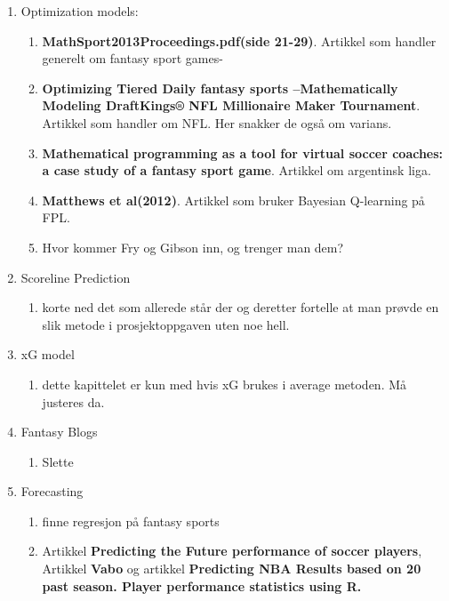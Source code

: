 \begin{enumerate}
    \item Optimization models: 
    \begin{enumerate}
        \item \textbf{MathSport2013Proceedings.pdf(side 21-29)}. Artikkel som handler generelt om fantasy sport games- 
        \item \textbf{Optimizing Tiered Daily fantasy sports –Mathematically Modeling DraftKings® NFL Millionaire Maker Tournament}. Artikkel som handler om NFL. Her snakker de også om varians.
        \item \textbf{Mathematical programming as a tool for virtual soccer coaches: a case study of a fantasy sport game}. Artikkel om argentinsk liga. 
        \item \textbf{Matthews et al(2012)}. Artikkel som bruker Bayesian Q-learning på FPL.
        \item Hvor kommer Fry og Gibson inn, og trenger man dem? 
    \end{enumerate}

    \item Scoreline Prediction
    \begin{enumerate}
        \item korte ned det som allerede står der og deretter fortelle at man prøvde en slik metode i prosjektoppgaven uten noe hell. 
    \end{enumerate}
    
    \item xG model 
    \begin{enumerate}
        \item dette kapittelet er kun med hvis xG brukes i average metoden. Må justeres da.
    \end{enumerate}
    
    \item Fantasy Blogs
    \begin{enumerate}
        \item Slette
    \end{enumerate}
    
    \item Forecasting 
        \begin{enumerate}
            \item finne regresjon på fantasy sports 
            \item Artikkel \textbf{Predicting the Future performance of
            soccer players}, Artikkel \textbf{Vabo} og artikkel \textbf{Predicting NBA Results based on 20 past season. Player performance statistics using R.}
        \end{enumerate}
\end{enumerate}
\fi  %